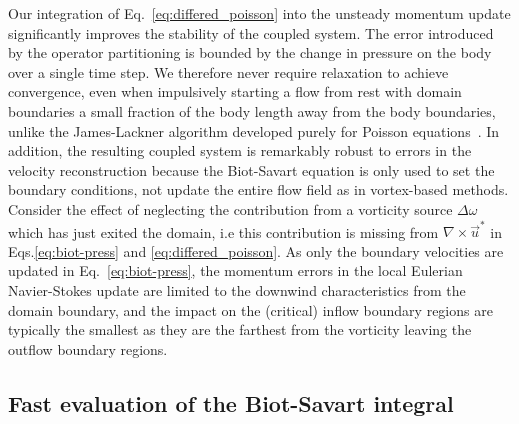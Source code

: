 \documentclass[final,1p,times]{elsarticle}
\begin{document}
Our integration of Eq.~\ref{eq:differed_poisson} into the unsteady momentum update significantly improves the stability of the coupled system. The error introduced by the operator partitioning is bounded by the change in pressure on the body over a single time step. We therefore never require relaxation to achieve convergence, even when impulsively starting a flow from rest with domain boundaries a small fraction of the body length away from the body boundaries, unlike the James-Lackner algorithm developed purely for Poisson equations~\cite{Miller2008AnBoundaries}. 
In addition, the resulting coupled system is remarkably robust to errors in the velocity reconstruction because the Biot-Savart equation is only used to set the boundary conditions, not update the entire flow field as in vortex-based methods. Consider the effect of neglecting the contribution from a vorticity source $\Delta\omega$ which has just exited the domain, i.e this contribution is missing from $\nabla\times\vec u^*$ in Eqs.\ref{eq:biot-press} and \ref{eq:differed_poisson}. As only the boundary velocities are updated in Eq.~\ref{eq:biot-press}, the momentum errors in the local Eulerian Navier-Stokes update are limited to the downwind characteristics from the domain boundary, and the impact on the (critical) inflow boundary regions are typically the smallest as they are the farthest from the vorticity leaving the outflow boundary regions. 


\subsection{Fast evaluation of the Biot-Savart integral}
\end{document}
